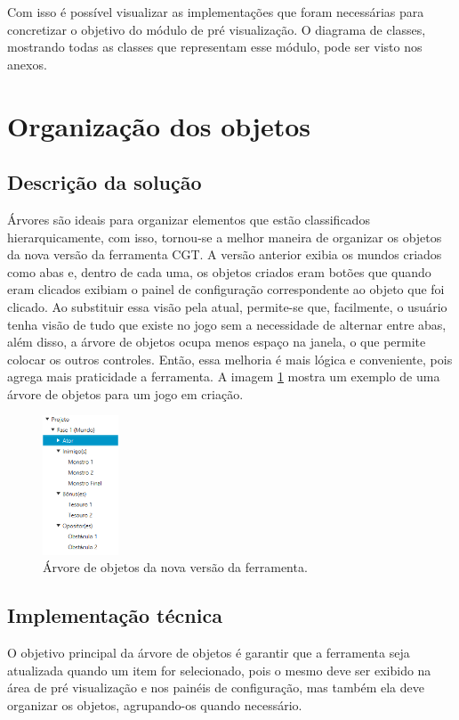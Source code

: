 \documentclass[12pt,twoside,openright,a4paper,english,brazil,sumario=tradicional]{abntex2}
\begin{document}
Com isso é possível visualizar as implementações que foram necessárias para concretizar o objetivo do módulo de pré visualização. O diagrama de classes, mostrando todas as classes que representam esse módulo, pode ser visto nos anexos.

\section{Organização dos objetos}

\subsection{Descrição da solução}
Árvores são ideais para organizar elementos que estão classificados hierarquicamente, com isso, tornou-se a melhor maneira de organizar os objetos da nova versão da ferramenta CGT.
A versão anterior exibia os mundos criados como abas e, dentro de cada uma, os objetos criados eram botões que quando eram clicados exibiam o painel de configuração correspondente ao objeto que foi clicado.
Ao substituir essa visão pela atual, permite-se que, facilmente, o usuário tenha visão de tudo que existe no jogo sem a necessidade de alternar entre abas, além disso, a árvore de objetos ocupa menos espaço na janela, o que permite colocar os outros controles.
Então, essa melhoria é mais lógica e conveniente, pois agrega mais praticidade a ferramenta.
A imagem \ref{fig:arvore_objetos} mostra um exemplo de uma árvore de objetos para um jogo em criação.

\begin{figure}[h]
\centering
\includegraphics[width=0.2\textwidth]{images/arvore_objetos.png}
\caption{Árvore de objetos da nova versão da ferramenta.}
\label{fig:arvore_objetos}
\end{figure}

\subsection{Implementação técnica}
O objetivo principal da árvore de objetos é garantir que a ferramenta seja atualizada quando um item for selecionado, pois o mesmo deve ser exibido na área de pré visualização e nos painéis de configuração, mas também ela deve organizar os objetos, agrupando-os quando necessário.
\end{document}
